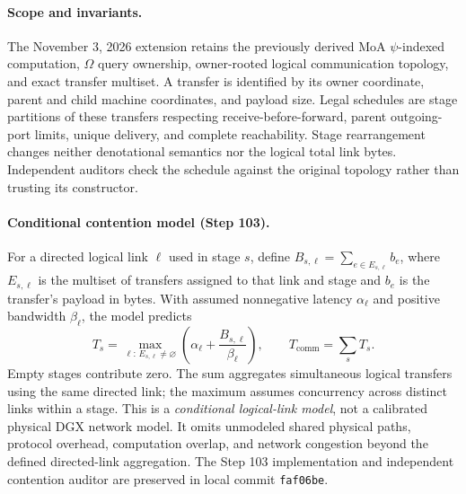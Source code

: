 \documentclass[11pt]{article}
\begin{document}
\paragraph{Scope and invariants.}
The November 3, 2026 extension retains the previously derived MoA
$\psi$-indexed computation, $\Omega$ query ownership, owner-rooted logical
communication topology, and exact transfer multiset. A transfer is identified
by its owner coordinate, parent and child machine coordinates, and payload
size. Legal schedules are stage partitions of these transfers respecting
receive-before-forward, parent outgoing-port limits, unique delivery, and
complete reachability. Stage rearrangement changes neither denotational
semantics nor the logical total link bytes. Independent auditors check the
schedule against the original topology rather than trusting its constructor.

\paragraph{Conditional contention model (Step 103).}
For a directed logical link $\ell$ used in stage $s$, define
$B_{s,\ell}=\sum_{e\in E_{s,\ell}}b_e$, where $E_{s,\ell}$ is the multiset
of transfers assigned to that link and stage and $b_e$ is the transfer's
payload in bytes. With assumed nonnegative latency $\alpha_\ell$ and
positive bandwidth $\beta_\ell$, the model predicts
\begin{equation}
  T_s=\max_{\ell:\,E_{s,\ell}\ne\varnothing}
       \left(\alpha_\ell+\frac{B_{s,\ell}}{\beta_\ell}\right),
  \qquad T_{\mathrm{comm}}=\sum_s T_s.
  \label{eq:step103-contention}
\end{equation}
Empty stages contribute zero. The sum aggregates simultaneous logical
transfers using the same directed link; the maximum assumes concurrency
across distinct links within a stage. This is a \emph{conditional logical-link
model}, not a calibrated physical DGX network model. It omits unmodeled
shared physical paths, protocol overhead, computation overlap, and network
congestion beyond the defined directed-link aggregation. The Step 103
implementation and independent contention auditor are preserved in local
commit \texttt{faf06be}.
\end{document}
